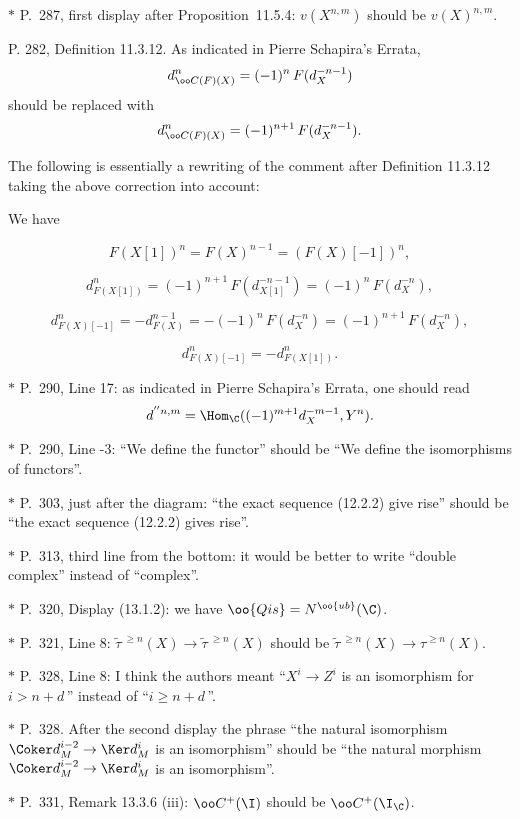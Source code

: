 \documentclass[12pt]{article}
\theoremstyle{remark}
\theoremstyle{definition}
\begin{document}
\nn$*$ P.~287, first display after Proposition~11.5.4: $v(X^{n,m})$ should be $v(X)^{n,m}$.

\begin{s}
P. 282, Definition 11.3.12. As indicated in Pierre Schapira's Errata, 
$$
d^n_{\oo C(F)(X)}=(-1)^n\,F(d_X^{-n-1})
$$ 
should be replaced with 
$$
d^n_{\oo C(F)(X)}=(-1)^{n+1}\,F(d_X^{-n-1}).
$$ 

The following is essentially a rewriting of the comment after Definition 11.3.12 taking the above correction into account:

We have 

$$F(X[1])^n=F(X)^{n-1}=(F(X)[-1])^n,$$ 

$$d^n_{F(X[1])}=(-1)^{n+1}\,F(d_{X[1]}^{-n-1})=(-1)^n\,F(d_X^{-n}),$$ 

$$d^n_{F(X)[-1]}=-d_{F(X)}^{n-1}=-(-1)^n\,F(d_X^{-n})=(-1)^{n+1}\,F(d_X^{-n}),$$ 

$$d^n_{F(X)[-1]}=-d^n_{F(X[1])}.$$
\end{s}

\begin{s}
\nn$*$ P.~290, Line 17: as indicated in Pierre Schapira's Errata, one should read 
$$
d^{''n,m}=\Hom_\C((-1)^{m+1}d_X^{-m-1},Y^n).
$$
\end{s}

\nn$*$ P.~290, Line -3: ``We define the functor'' should be ``We define the isomorphisms of functors''.

\nn$*$ P.~303, just after the diagram: ``the exact sequence (12.2.2) give rise'' should be ``the exact sequence (12.2.2) gives rise''.

\nn$*$ P.~313, third line from the bottom: it would be better to write ``double complex'' instead of ``complex''.

\nn$*$ P.~320, Display (13.1.2): we have $\oo{Qis}=N^{\oo{ub}}(\C)$.

\nn$*$ P.~321, Line 8: $\widetilde\tau\,{}^{\ge n}(X)\to\widetilde\tau\,{}^{\ge n}(X)$ should be $\widetilde\tau\,{}^{\ge n}(X)\to\tau^{\ge n}(X)$.

\nn$*$ P.~328, Line 8: I think the authors meant ``$X^i\to Z^i$ is an isomorphism for $i>n+d\,$'' instead of ``$i\ge n+d\,$''.

\nn$*$ P.~328. After the second display the phrase ``the natural isomorphism $\Coker d_M^{i-2}\to\Ker d_M^i$ is an isomorphism'' should be ``the natural morphism $\Coker d_M^{i-2}\to\Ker d_M^i$ is an isomorphism''.

\nn$*$ P.~331, Remark 13.3.6 (iii): $\oo C^+(\I)$ should be $\oo C^+(\I_\C)$.
\end{document}

